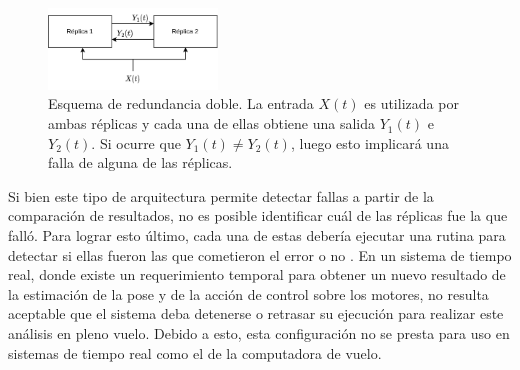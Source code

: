 \begin{figure}[H]
    \centering
    \includegraphics[width=0.4\textwidth]{img/redundancia_doble.png}
    \caption{Esquema de redundancia doble. La entrada $X(t)$ es utilizada por ambas réplicas y cada una de ellas obtiene una salida $Y_1(t)$ e $Y_2(t)$. Si ocurre que $Y_1(t) \neq Y_2(t)$, luego esto implicará una falla de alguna de las réplicas. }
    \label{fig:redundancia_doble}
\end{figure}


Si bien este tipo de arquitectura permite detectar fallas a partir de la comparación de resultados, no es posible identificar cuál de las réplicas fue la que falló. Para lograr esto último, cada una de estas debería ejecutar una rutina para detectar si ellas fueron las que cometieron el error o no \cite{baleani2003fault}. En un sistema de tiempo real, donde existe un requerimiento temporal para obtener un nuevo resultado de la estimación de la pose y de la acción de control sobre los motores, no resulta aceptable que el sistema deba detenerse o retrasar su ejecución para realizar este análisis en pleno vuelo. Debido a esto, esta configuración no se presta para uso en sistemas de tiempo real como el de la computadora de vuelo.



